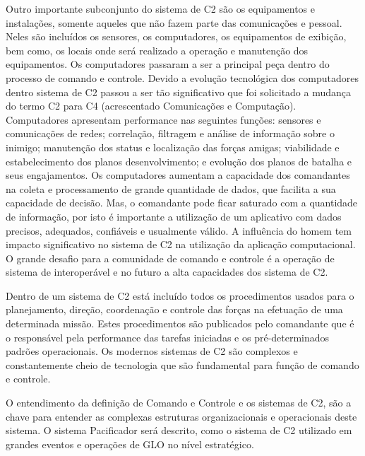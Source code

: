 Outro importante subconjunto do sistema de C2 são os equipamentos e instalações, somente aqueles que não fazem parte das comunicações e pessoal. Neles são incluídos os sensores, os computadores, os equipamentos de exibição, bem como, os locais onde será realizado a operação e manutenção dos equipamentos. Os computadores passaram a ser a principal peça dentro do processo de comando e controle. Devido a evolução tecnológica dos computadores dentro sistema de C2 passou a ser tão significativo que foi solicitado a mudança do termo C2 para C4 (acrescentado Comunicações e Computação). Computadores apresentam performance nas seguintes funções: sensores e comunicações de redes; correlação, filtragem e análise de informação sobre o inimigo; manutenção dos status e localização das forças amigas; viabilidade e estabelecimento dos planos desenvolvimento; e evolução dos planos de batalha e seus engajamentos. Os computadores aumentam a capacidade dos comandantes na coleta e processamento de grande quantidade de dados, que facilita a sua capacidade de decisão. Mas, o comandante pode ficar saturado com a quantidade de informação, por isto é importante a utilização de um aplicativo com dados precisos, adequados, confiáveis e usualmente válido. A influência do homem tem impacto significativo no sistema de C2 na utilização da aplicação computacional. O grande desafio para a comunidade de comando e controle é a operação de sistema de interoperável e no futuro a alta capacidades dos sistema de C2.

Dentro de um sistema de C2 está incluído todos os procedimentos usados para o planejamento, direção, coordenação e controle das forças na efetuação de uma determinada missão. Estes procedimentos são publicados pelo comandante que é o responsável pela performance das tarefas iniciadas e os pré-determinados padrões operacionais. Os modernos sistemas de C2 são complexos e constantemente cheio de tecnologia que são fundamental para função de comando e controle.

O entendimento da definição de Comando e Controle e os sistemas de C2, são a chave para entender as complexas estruturas organizacionais e operacionais deste sistema. O sistema Pacificador será descrito, como o sistema de C2 utilizado em grandes eventos e operações de GLO no nível estratégico. 
